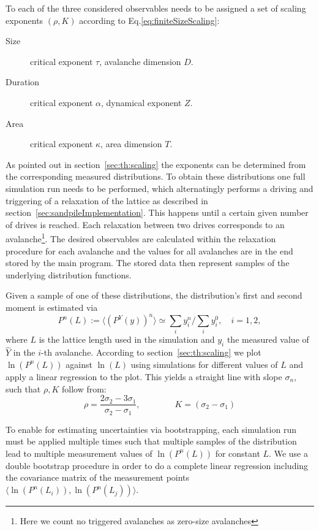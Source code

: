 To each of the three considered observables needs to be assigned a set of scaling exponents $(\rho,K)$
according to Eq.\eqref{eq:finiteSizeScaling}:
\begin{description}
\item[Size] critical exponent $\tau$, avalanche dimension $D$.
\item[Duration] critical exponent $\alpha$, dynamical exponent $Z$.
\item[Area] critical exponent $\kappa$, area dimension $T$.
\end{description}

As pointed out in section~\ref{sec:th:scaling} the exponents can be determined from the corresponding measured
distributions. To obtain these distributions one full simulation run needs to be performed, which alternatingly performs
a driving and triggering of a relaxation of the lattice as described in section~\ref{sec:sandpileImplementation}.
This happens until a certain given number of drives is reached. Each relaxation between two drives corresponds to an
avalanche\footnote{Here we count no triggered avalanches as zero-size avalanches}. The desired observables are
calculated within the relaxation procedure for each avalanche and the values for all avalanches are in the end stored
by the main program. The stored data then represent samples of the underlying distribution functions.

Given a sample of one of these distributions, the distribution's first and second moment is estimated via
\begin{equation}
P^n(L) := \langle (P^{Y}(y))^n \rangle \simeq \sum_i y_i^n \Big/ \sum_i y_i^0,\quad i=1,2,
\end{equation}
where $L$ is the lattice length used in the simulation and $y_i$ the measured value of $\hat{Y}$ in the $i$-th avalanche.
According to section~\ref{sec:th:scaling} we plot $\ln\left(P^n(L)\right)$ against $\ln\left(L\right)$ using simulations
for different values of $L$ and apply a linear regression to the plot. This yields a straight line with slope $\sigma_n$,
such that $\rho, K$ follow from:
\begin{equation}
\rho = \frac{2\sigma_2 - 3\sigma_1}{\sigma_2 - \sigma_1}, \qquad\qquad K = (\sigma_2-\sigma_1)
\end{equation}

To enable for estimating uncertainties via bootstrapping, each simulation run must be applied multiple times
such that multiple samples of the distribution lead to multiple measurement values of $\ln\left(P^n(L)\right)$ for
constant $L$. We use a double bootstrap procedure in order to do a complete linear regression including the covariance
matrix of the measurement points $\langle\ln\left(P^n(L_i)\right), \ln\left(P^n(L_j)\right)\rangle$.


